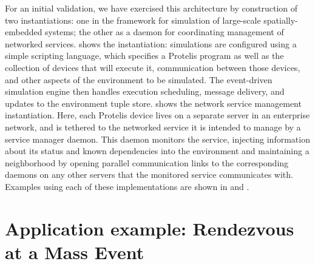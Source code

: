 \documentclass[12pt,a4paper,twoside,openright]{book}
\begin{document}
For an initial validation, we have exercised this architecture by construction of two instantiations: one in the \alchemist{} framework for simulation of large-scale spatially-embedded systems; the other as a daemon for coordinating management of networked services.
%
 shows the \alchemist{} instantiation: simulations are configured using a simple scripting language, which specifies a Protelis program as well as the collection of devices that will execute it, communication between those devices, and other aspects of the environment to be simulated.
%
The \alchemist{} event-driven simulation engine then handles execution scheduling, message delivery, and updates to the environment tuple store.
%
 shows the network service management instantiation.
%
Here, each Protelis device lives on a separate server in an enterprise network, and is tethered to the networked service it is intended to manage by a service manager daemon.
%
This daemon monitors the service, injecting information about its status and known dependencies into the environment and maintaining a neighborhood by opening parallel communication links to the corresponding daemons on any other servers that the monitored service communicates with.
%
Examples using each of these implementations are shown in  and .

\section{Application example: Rendezvous at a Mass Event}
\label{protelis-rendezvous}
\end{document}
